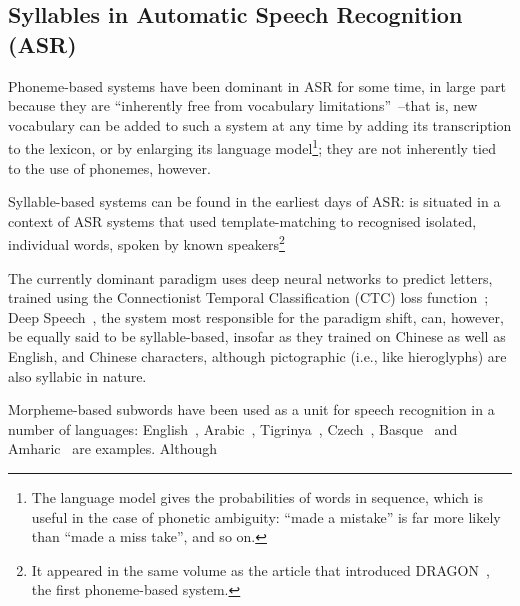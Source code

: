 \documentclass{article}[11pt]
\begin{document}

\subsection{Syllables in Automatic Speech Recognition (ASR)}
\label{ssect:syllasr}

Phoneme-based systems have been dominant in ASR for some time, in large part because they are ``inherently free from vocabulary limitations''~\citep{lopes_phoneme_2011}--that is, new vocabulary can be added to such a system at any time by adding its transcription to the lexicon, or by enlarging its language model\footnote{The language model gives the probabilities of words in sequence, which is useful in the case of phonetic ambiguity: ``made a mistake'' is far more likely than ``made a miss take'', and so on.}; they are not inherently tied to the use of phonemes, however.

Syllable-based systems can be found in the earliest days of ASR: \citet{fujimura_syllable_1975} is situated in a context of ASR systems that used template-matching to recognised isolated, individual words, spoken by known speakers\footnote{It appeared in the same volume as the article that introduced DRAGON~\citep{baker_dragon_1975}, the first phoneme-based system.}

The currently dominant paradigm uses deep neural networks to predict letters, trained using the Connectionist Temporal Classification (CTC) loss function~\citep{graves_towards_2014}; Deep Speech~\citep{hannun_deep_2014}, the system most responsible for the paradigm shift, can, however, be equally said to be syllable-based, insofar as they trained on Chinese as well as English, and Chinese characters, although pictographic (i.e., like hieroglyphs) are also syllabic in nature.

Morpheme-based subwords have been used as a unit for speech recognition in a number of languages: English~\citep{huckvale_using_2002}, Arabic~\citep{jafri_concatenative_2021}, Tigrinya~\citep{abera_tigrinya_2020}, Czech~\citep{hejtmanek_using_2010}, Basque~\citep{guijarrubia_morpheme-based_2009} and Amharic~\citep{tachbelie_morpheme-based_2010} are examples. Although
\end{document}
